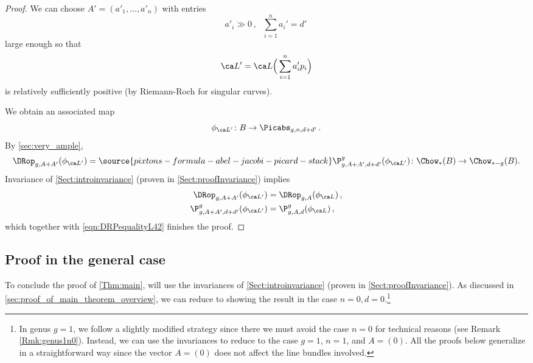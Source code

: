 \begin{proof}
We can choose $A' = (a'_1,\dots, a'_n)$ with entries
$$a'_i \gg 0\, , \ \ \ \sum_{i=1}^na_i' =d'\, $$
large enough so that $$\ca L' = \ca L\Big(\sum_{i=1}^n a'_ip_i\Big)$$
is relatively sufficiently positive (by Riemann-Roch for singular curves).

We obtain an associated map
$$\phi_{{\ca L}'} \colon B \to \Picabs_{g,n,d+d'}\, .$$
By \cref{sec:very_ample},
\begin{equation} \label{eqn:DRPequalityL42} \DRop_{g,A+A'}(\phi_{{\ca L}'})=
\source{pixtons-formula-abel-jacobi-picard-stack}
\P_{g,A+A',d+d'}^g(\phi_{{\ca L}'}) \colon \Chow_*(B) \to \Chow_{*-g}(B).
\end{equation}
Invariance \invnrA{} of \cref{Sect:introinvariance} (proven
in \cref{Sect:proofInvariance}) implies
\begin{align*}
\DRop_{g,A+A'}(\phi_{{\ca L'}})
&=\DRop_{g,A}(\phi_{{\ca L}})\, ,\\ \P^g_{g,A+A',d+d'}(\phi_{{\ca L'}})
&=\P^g_{g,A,d}(\phi_{{\ca L}})\, ,
\end{align*}
which together with \eqref{eqn:DRPequalityL42} finishes the proof.
\end{proof}

\subsection{Proof in the general case}\label{sec:general_case}

To conclude the proof of \cref{Thm:main},
will use the invariances  of \cref{Sect:introinvariance}
(proven in \cref{Sect:proofInvariance}). As discussed in \cref{sec:proof_of_main_theorem_overview}, we can reduce to showing the result in the case $n=0, d=0$.\footnote{In genus $g=1$, we  follow a slightly modified strategy since there we must avoid the case $n=0$ for technical reasons (see Remark \ref{Rmk:genus1n0}). Instead, we can use the invariances to reduce to the case $g=1$, $n=1$, and $A=(0)$. All the proofs below generalize in a straightforward way since the vector $A=(0)$ does not affect the line bundles involved.}



